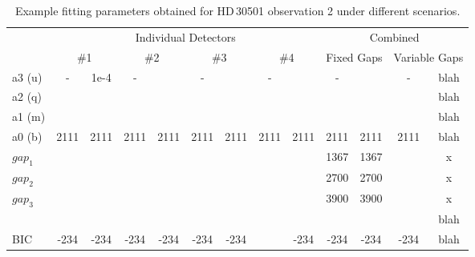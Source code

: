 \begin{table}
    \small
    \caption{Example fitting parameters obtained for HD\,30501 observation 2 under different scenarios.}
    \begin{tabular}{|l|c|c|c|c|c|c|c|c|c|c|c|c|}
    	\toprule
    	  &    \multicolumn{8}{c|}{Individual Detectors}    &    \multicolumn{4}{c|}{Combined}    \\
    	  & \multicolumn{2}{c|}{\#1} & \multicolumn{2}{c|}{\#2} & \multicolumn{2}{c|}{\#3} & \multicolumn{2}{c|}{\#4} & \multicolumn{2}{c|}{Fixed Gaps} & \multicolumn{2}{c|}{Variable Gaps} \\ \midrule
    	a3 (u)    &  -   &    1e-4    &  -   &    &  -   &    &  -   &    &  -   &    &  -   &    blah    \\
    	a2 (q)    &      &    &    &    &    &    &    &    &    &    &    &    blah    \\
    	a1 (m)   &      &    &    &    &    &    &    &    &    &    &    &    blah    \\
    	a0 (b)    & 2111 &    2111    & 2111 &    2111    & 2111 &    2111    & 2111 &    2111    & 2111 &    2111    & 2111 & blah \\
        \(gap_{1}\) &      &    &    &    &    &    &    &    &   1367  & 1367   &   & x\\
        \(gap_{2}\) &      &    &    &    &    &    &    &    &  2700   &  2700  &   & x\\
        \(gap_{3}\) &      &    &    &    &    &    &    &    &   3900 &   3900 &    & x\\
    	\textchisquared{} &    &    &    &    &    &    &    &    &    &    &    &    blah    \\
    	BIC        & -234      &    -234    & -234 &    -234    & -234 &    -234    &    &    -234    & -234 &    -234    & -234 &    blah  \\
        \bottomrule
    \end{tabular}\label{tab:example_calibration_parametres}
\end{table}


